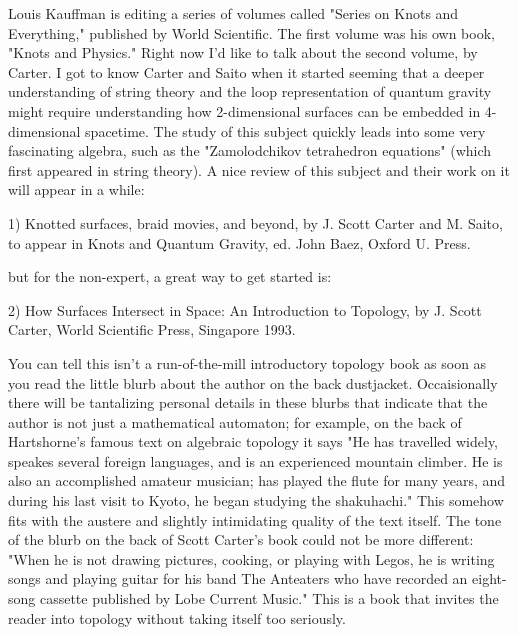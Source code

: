 

Louis Kauffman is editing a series of volumes called "Series on Knots
and Everything," published by World Scientific.  The first volume was
his own book, "Knots and Physics."  Right now I'd like to talk about the
second volume, by Carter.  I got to know Carter and Saito when it
started seeming that a deeper understanding of string theory and the
loop representation of quantum gravity might require understanding how
2-dimensional surfaces can be embedded in 4-dimensional spacetime.  The
study of this subject quickly leads into some very fascinating algebra,
such as the "Zamolodchikov tetrahedron equations" (which first appeared in
string theory).  A nice review of this subject and their work on it will
appear in a while: 

1) Knotted surfaces, braid movies, and beyond, by J. Scott Carter and M.
Saito, to appear in Knots and Quantum Gravity, ed. John Baez, Oxford U.
Press.  

but for the non-expert, a great way to get started is:

2) How Surfaces Intersect in Space: An Introduction to Topology, by J.
Scott Carter, World Scientific Press, Singapore 1993.

You can tell this isn't a run-of-the-mill introductory topology book
as soon as you read the little blurb about the author on the back
dustjacket.  Occaisionally there will be tantalizing personal details
in these blurbs that indicate that the author is not just a mathematical
automaton; for example, on the back of Hartshorne's famous text on
algebraic topology it says "He has travelled widely, speakes several
foreign languages, and is an experienced mountain climber.  He is also
an accomplished amateur musician; has played the flute for many years,
and during his last visit to Kyoto, he began studying the shakuhachi."  
This somehow fits with the austere and slightly intimidating quality of
the text itself.  The tone of the blurb on the back of Scott Carter's
book could not be more different: "When he is not drawing pictures,
cooking, or playing with Legos, he is writing songs and playing guitar
for his band The Anteaters who have recorded an eight-song cassette
published by Lobe Current Music."  This is a book that invites the
reader into topology without taking itself too seriously.


